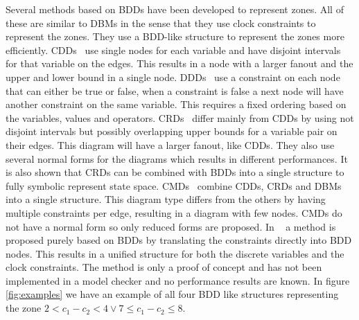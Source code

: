 Several methods based on BDDs have been developed to represent zones. All of these are similar to DBMs in the sense that they use clock constraints to represent the zones. They use a BDD-like structure to represent the zones more efficiently. CDDs~\cite{BRICS19491} use single nodes for each variable and have disjoint intervals for that variable on the edges. This results in a node with a larger fanout and the upper and lower bound in a single node. DDDs~\cite{ddds, ddd-datastructure-99} use a constraint on each node that can either be true or false, when a constraint is false a next node will have another constraint on the same variable. This requires a fixed ordering based on the variables, values and operators. CRDs~\cite{crds} differ mainly from CDDs by using not disjoint intervals but possibly overlapping upper bounds for a variable pair on their edges. This diagram will have a larger fanout, like CDDs. They also use several normal forms for the diagrams which results in different performances. It is also shown that CRDs can be combined with BDDs into a single structure to fully symbolic represent state space. CMDs~\cite{5702245} combine CDDs, CRDs and DBMs into a single structure. This diagram type differs from the others by having multiple constraints per edge, resulting in a diagram with few nodes. CMDs do not have a normal form so only reduced forms are proposed. In ~\cite{7098276, 7184781} a method is proposed purely based on BDDs by translating the constraints directly into BDD nodes. This results in a unified structure for both the discrete variables and the clock constraints. The method is only a proof of concept and has not been implemented in a model checker and no performance results are known. In figure \ref{fig:examples} we have an example of all four BDD like structures representing the zone $2 < c_1 - c_2 < 4 \vee 7 \leq c_1 - c_2 \leq 8$.

